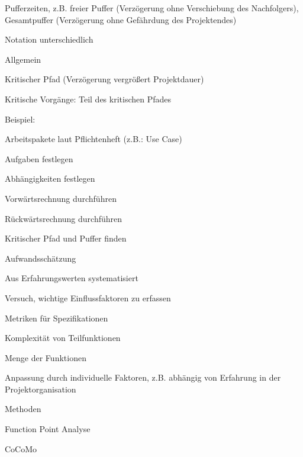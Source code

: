 \documentclass[a4paper]{article}
\begin{document}
\begin{multicols}{3}
\begin{itemize*}
\begin{itemize*}
\begin{itemize*}
                    \item Pufferzeiten, z.B. freier Puffer (Verzögerung ohne Verschiebung des Nachfolgers), Gesamtpuffer (Verzögerung ohne Gefährdung des Projektendes)
                    \item Notation unterschiedlich
                  \end{itemize*}
            \item Allgemein
                  \begin{itemize*}
                    \item Kritischer Pfad (Verzögerung vergrößert Projektdauer)
                    \item Kritische Vorgänge: Teil des kritischen Pfades
                  \end{itemize*}
          \end{itemize*}
  \end{itemize*}

  Beispiel:
  \begin{itemize*}
    \item Arbeitspakete laut Pflichtenheft (z.B.: Use Case)
    \item Aufgaben festlegen
    \item Abhängigkeiten festlegen
    \item Vorwärtsrechnung durchführen
    \item Rückwärtsrechnung durchführen
    \item Kritischer Pfad und Puffer finden
  \end{itemize*}

  Aufwandsschätzung
  \begin{itemize*}
    \item Aus Erfahrungswerten systematisiert
    \item Versuch, wichtige Einflussfaktoren zu erfassen
          \begin{itemize*}
            \item Metriken für Spezifikationen
            \item Komplexität von Teilfunktionen
            \item Menge der Funktionen
            \item Anpassung durch individuelle Faktoren, z.B. abhängig von Erfahrung in der Projektorganisation
          \end{itemize*}
    \item Methoden
          \begin{itemize*}
            \item Function Point Analyse
            \item CoCoMo
          \end{itemize*}
  \end{itemize*}


\end{multicols}
\end{document}
